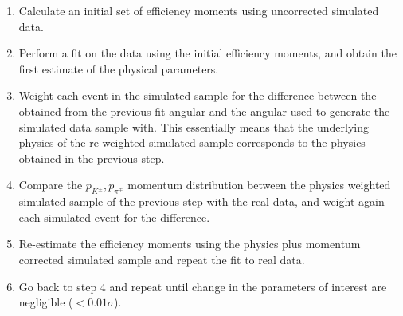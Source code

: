 \begin{enumerate}
\item Calculate an initial set of efficiency moments using uncorrected \BsJpsiKst simulated data.
\item Perform a fit on the \BsJpsiKst data using the initial efficiency moments, and obtain the first estimate of the physical parameters.
\item Weight each event in the simulated sample for the difference between the obtained from the previous fit angular \pdf and the angular \pdf used to 
      generate the simulated data sample with. 
      This essentially means that the underlying physics of the re-weighted simulated  sample corresponds to the physics obtained in the previous step.
\item Compare the $p_{K^{\pm}},p_{\pi^{\mp}}$ momentum distribution between the physics weighted simulated sample of the previous step with the 
      real data, and weight again each simulated event for the difference.
\item Re-estimate the efficiency moments using the physics plus momentum corrected \BsJpsiKst simulated sample and repeat the fit to \BsJpsiKst real data.
\item Go back to step 4 and repeat until change in the parameters of interest are negligible ($<0.01\sigma$).
\end{enumerate} 


